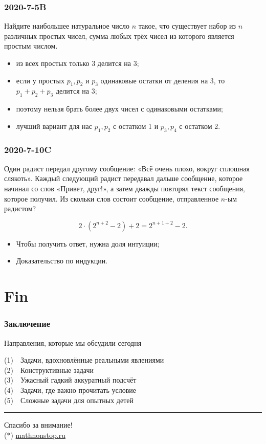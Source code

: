 \documentclass[aspectratio=1610,12pt]{beamer}
\def\ll{\left(} \def\rr{\right)}
\def\usl#1{\vspace{-6mm} \begin{block}{\vspace*{-3ex}} #1 \end{block} \medskip\pause}
\begin{document}
\begin{frame} \frametitle{2020-7-5B}
\usl{Найдите наибольшее натуральное число $n$ такое, что существует набор из $n$ различных простых чисел, сумма любых трёх чисел из которого является простым числом.}

\begin{itemize}
	\item из всех простых только 3 делится на 3;
	\item если у простых $p_1, p_2$ и $p_3$ одинаковые остатки от деления на 3, то $p_1+p_2+p_3$ делится на 3;
	\item поэтому нельзя брать более двух чисел с одинаковыми остатками;
	\item лучший вариант для нас $p_1, p_2$ с остатком 1 и $p_3, p_4$ с остатком 2.
\end{itemize}

\end{frame}

\begin{frame} \frametitle{2020-7-10C}
\usl{Один радист передал другому сообщение: «Всё очень плохо, вокруг сплошная слякоть». Каждый следующий радист передавал дальше сообщение, которое начинал со слов «Привет, друг!», а затем дважды повторял текст сообщения, которое получил. Из скольки слов состоит сообщение, отправленное $n$-ым радистом?}

	$$2 \cdot \ll 2^{n+2} - 2 \rr + 2 = 2^{n+1+2} - 2.$$

\begin{itemize}
	\item Чтобы получить ответ, нужна доля интуиции;
	\item Доказательство по индукции.
\end{itemize}

\end{frame}



\section[Конец]{Fin}

\def\fitem#1#2{\textcolor{hard}{\small (#1)}~~#2 \medskip \\}

\begin{frame} \frametitle{Заключение}

\textcolor{hard}{Направления, которые мы обсудили сегодня} \medskip

\fitem{1}{Задачи, вдохновлённые реальными явлениями}
\fitem{2}{Конструктивные задачи}
\fitem{3}{Ужасный гадкий аккуратный подсчёт}
\fitem{4}{Задачи, где важно прочитать условие}
\fitem{5}{Сложные задачи для опытных детей \vspace{6mm}}

\hrule
\begin{center}
	{\LARGE Спасибо за внимание!} \smallskip \\
	{\footnotesize \textcolor{hard}{($*$)\quad}
		\url{mathnonstop.ru}
		\phantom{($*$)\quad}}
\end{center} \vspace{2.4mm}
\end{frame}
\end{document}

